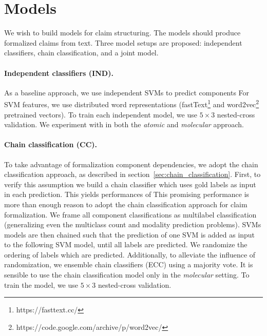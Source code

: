 \section{Models}
\label{sec:claim_struc_models}

We wish to build models for claim structuring. The models should produce 
formalized claims from text. 
Three model setups are proposed: independent classifiers, 
chain classification, and a joint model. 

\paragraph{Independent classifiers (IND). }
As a baseline approach, we use independent SVMs to predict components
For SVM features, we use distributed word representations
(fastText\footnote{https://fasttext.cc/}
and word2vec\footnote{https://code.google.com/archive/p/word2vec/}
pretrained vectors).
To train each independent model, we use $5 \times 3$ nested-cross validation.
We experiment with in both the \emph{atomic} and \emph{molecular} approach.

\paragraph{Chain classification (CC). }
To take advantage of formalization component dependencies, we adopt the chain
classification approach, as described in
section~\ref{sec:chain_classification}.
First, to verify this assumption we build a chain classifier which uses gold 
labels as input in each prediction.  
This yields performances of 
This promising performance is more than enough reason to adopt the
chain classification approach for claim formalization. 
We frame all component classifications as multilabel classification 
(generalizing even the multiclass count and modality prediction problems).
SVMs models are then chained such that the prediction of one SVM is added as
input to the following SVM model, until all labels are predicted. We randomize 
the ordering of labels which are predicted.
Additionally, to alleviate the influence of randomization, we 
ensemble chain classifiers (ECC) using a majority vote. 
It is sensible to use the chain classification model only in the
\emph{molecular} setting. 
To train the model, we use $5 \times 3$ nested-cross validation. 

